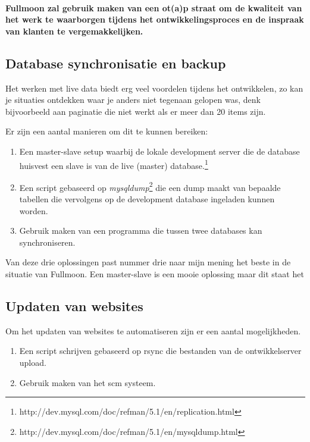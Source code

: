 \documentclass[12pt,a4paper]{article}
\begin{document}
    \paragraph{Fullmoon zal gebruik maken van een {\sc ot(a)p} straat om de kwaliteit van het werk te waarborgen tijdens het ontwikkelingsproces en de inspraak van klanten te vergemakkelijken.}
    
    \subsection{Database synchronisatie en backup}
    
    Het werken met live data biedt erg veel voordelen tijdens het ontwikkelen, zo kan je situaties ontdekken waar je anders niet tegenaan gelopen was, denk bijvoorbeeld aan paginatie die niet werkt als er meer dan 20 items zijn. 
    
    Er zijn een aantal manieren om dit te kunnen bereiken:
    
    \begin{enumerate}
      \item Een master-slave setup waarbij de lokale development server die de database huisvest een slave is van de live (master) database.\footnote{http://dev.mysql.com/doc/refman/5.1/en/replication.html}
      \item Een script gebaseerd op \emph{mysqldump}\footnote{http://dev.mysql.com/doc/refman/5.1/en/mysqldump.html} die een dump maakt van bepaalde tabellen die vervolgens op de development database ingeladen kunnen worden.
      \item Gebruik maken van een programma die tussen twee databases kan synchroniseren.
    \end{enumerate}
    
    Van deze drie oplossingen past nummer drie naar mijn mening het beste in de situatie van Fullmoon. Een master-slave is een mooie oplossing maar dit staat het 
    
    \subsection{Updaten van websites}
  
    Om het updaten van websites te automatiseren zijn er een aantal mogelijkheden. 
    
    \begin{enumerate}
      \item Een script schrijven gebaseerd op {\sc rsync} die bestanden van de ontwikkelserver upload.
      \item Gebruik maken van het {\sc scm} systeem.
    \end{enumerate}
    
\end{document}
